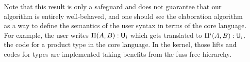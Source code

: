 \documentclass{article}
\begin{document}
Note that this result is only a safeguard and does not guarantee that our algorithm is entirely well-behaved, and one
should see the elaboration algorithm as a way to define the semantics of the user syntax in terms
of the core language.\\

For example, the user writes $\Pi(A,B) : \textsf{U}_i$ which gets translated to $\Pi^i(A,B) : \textsf{U}_i$, the code
for a product type in the core language. In the kernel, those lifts and codes for types are implemented taking
benefits from the fuss-free hierarchy.

\begin{exemple}
\end{exemple}

\pagebreak

\printbibliography
\end{document}
